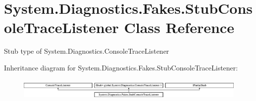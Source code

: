 \hypertarget{class_system_1_1_diagnostics_1_1_fakes_1_1_stub_console_trace_listener}{\section{System.\-Diagnostics.\-Fakes.\-Stub\-Console\-Trace\-Listener Class Reference}
\label{class_system_1_1_diagnostics_1_1_fakes_1_1_stub_console_trace_listener}
}


Stub type of System.\-Diagnostics.\-Console\-Trace\-Listener 


Inheritance diagram for System.\-Diagnostics.\-Fakes.\-Stub\-Console\-Trace\-Listener\-:\begin{figure}[H]
\begin{center}
\leavevmode
\includegraphics[height=1.075889cm]{class_system_1_1_diagnostics_1_1_fakes_1_1_stub_console_trace_listener}
\end{center}
\end{figure}
